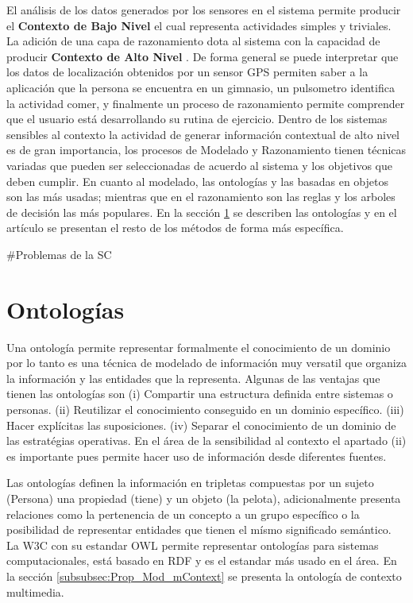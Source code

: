 El análisis de los datos generados por los sensores en el sistema permite producir el \textbf{Contexto de Bajo Nivel} el cual representa actividades simples y triviales. La adición de una capa de razonamiento dota al sistema con la capacidad de producir \textbf{Contexto de Alto Nivel} . De forma general se puede interpretar que los datos de localización obtenidos por un sensor GPS permiten saber a la aplicación que la persona se encuentra en un gimnasio, un pulsometro identifica la actividad comer, y finalmente un proceso de razonamiento permite comprender que el usuario está desarrollando su rutina de ejercicio.
Dentro de los sistemas sensibles al contexto la actividad de generar información contextual de alto nivel es de gran importancia, los procesos de Modelado y Razonamiento tienen técnicas variadas que pueden ser seleccionadas de acuerdo al sistema y los objetivos que deben cumplir. En cuanto al modelado, las ontologías y las basadas en objetos son las más usadas; mientras que en el razonamiento son las reglas y los arboles de decisión las más populares. En la sección \ref{sec:MT_Ontologias} se describen las ontologías y en el artículo \cite{A Survey of Context Modelling and Reasoning Techniques} se presentan el resto de los métodos de forma más específica.

#Problemas de la SC \cite{Alegre2016}


\section{Ontologías}
\label{sec:MT_Ontologias}

Una ontología permite representar formalmente el conocimiento de un dominio por lo tanto es una técnica de modelado de información muy versatil que organiza la información y las entidades que la representa.
Algunas de las ventajas que tienen las ontologías son (i) Compartir una estructura definida entre sistemas o personas. (ii) Reutilizar el conocimiento conseguido en un dominio específico. (iii) Hacer explícitas las suposiciones. (iv) Separar el conocimiento de un dominio de las estratégias operativas. En el área de la sensibilidad al contexto el apartado (ii) es importante pues permite hacer uso de información desde diferentes fuentes.

Las ontologías definen la información en tripletas compuestas por un sujeto (Persona) una propiedad (tiene) y un objeto (la pelota), adicionalmente presenta relaciones como la pertenencia de un concepto a un grupo específico o la posibilidad de representar entidades que tienen el mísmo significado semántico. La W3C con su estandar OWL \cite{CITA W3C OWL} permite representar ontologías para sistemas computacionales, está basado en RDF y es el estandar más usado en el área.
En la sección \ref{subsubsec:Prop_Mod_mContext} se presenta la ontología de contexto multimedia.

